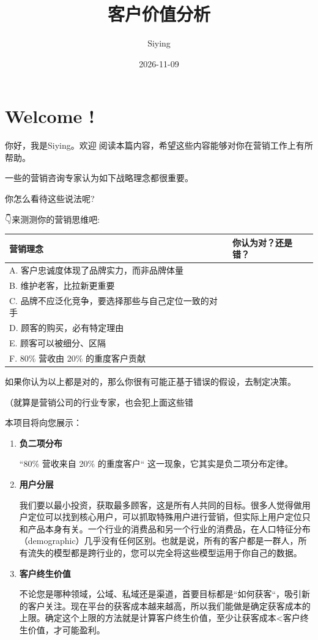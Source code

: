 \documentclass[
]{ctexart}
\title{客户价值分析}
\author{Siying}
\date{2026-11-09}
\newcounter{none} %
\begin{document}
\maketitle


\section{Welcome !}\label{welcome}

你好，我是Siying。欢迎👏阅读本篇内容，希望这些内容能够对你在营销工作上有所帮助。

一些的营销咨询专家认为如下战略理念都很重要。

你怎么看待这些说法呢?

👇来测测你的营销思维吧:

{\def\LTcaptype{none} %
\begin{longtable}[]{@{}ll@{}}
\toprule\noalign{}
营销理念 & 你认为对？还是错？ \\
\midrule\noalign{}
\endhead
\bottomrule\noalign{}
\endlastfoot
A. 客户忠诚度体现了品牌实力，而非品牌体量 & \\
B. 维护老客，比拉新更重要 & \\
C. 品牌不应泛化竞争，要选择那些与自己定位一致的对手 & \\
D. 顾客的购买，必有特定理由 & \\
E. 顾客可以被细分、区隔 & \\
F. 80\% 营收由 20\% 的重度客户贡献 & \\
\end{longtable}
}

如果你认为以上都是对的，那么你很有可能正基于错误的假设，去制定决策。

（就算是营销公司的行业专家，也会犯上面这些错

本项目将向您展示：

\begin{enumerate}
\def\labelenumi{\arabic{enumi}.}
\item
  \textbf{负二项分布}

  ``80\% 营收来自 20\% 的重度客户`` 这一现象，它其实是负二项分布定律。
\item
  \textbf{用户分层}

  我们要以最小投资，获取最多顾客，这是所有人共同的目标。很多人觉得做用户定位可以找到核心用户，可以抓取特殊用户进行营销，但实际上用户定位只和产品本身有关。一个行业的消费品和另一个行业的消费品，在人口特征分布（demographic）几乎没有任何区别。也就是说，所有的客户都是一群人，所有流失的模型都是跨行业的，您可以完全将这些模型运用于你自己的数据。
\item
  \textbf{客户终生价值}

  不论您是哪种领域，公域、私域还是渠道，首要目标都是``如何获客``，吸引新的客户关注。现在平台的获客成本越来越高，所以我们能做是确定获客成本的上限。确定这个上限的方法就是计算客户终生价值，至少让获客成本\textless 客户终生价值，才可能盈利。
\end{enumerate}
\end{document}
